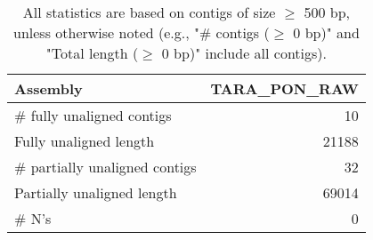 \documentclass[12pt,a4paper]{article}
\begin{document}
\begin{table}[ht]
\begin{center}
\caption{All statistics are based on contigs of size $\geq$ 500 bp, unless otherwise noted (e.g., "\# contigs ($\geq$ 0 bp)" and "Total length ($\geq$ 0 bp)" include all contigs).}
\begin{tabular}{|l*{1}{|r}|}
\hline
Assembly & TARA\_PON\_RAW \\ \hline
\# fully unaligned contigs & 10 \\ \hline
Fully unaligned length & 21188 \\ \hline
\# partially unaligned contigs & 32 \\ \hline
Partially unaligned length & 69014 \\ \hline
\# N's & 0 \\ \hline
\end{tabular}
\end{center}
\end{table}
\end{document}
